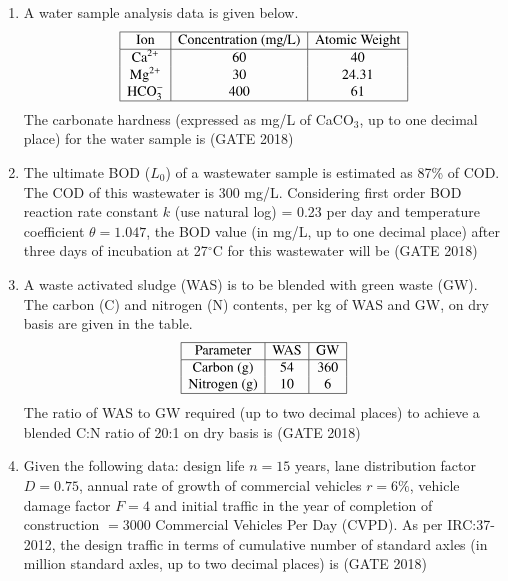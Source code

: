 \documentclass[journal,12pt,onecolumn]{IEEEtran}
\theoremstyle{remark}
\begin{document}
\begin{enumerate}
\item A water sample analysis data is given below.
\[
\begin{array}{|c|c|c|}
\hline
\text{Ion} & \text{Concentration (mg/L)} & \text{Atomic Weight} \\
\hline
\text{Ca}^{2+} & 60 & 40 \\
\text{Mg}^{2+} & 30 & 24.31 \\
\text{HCO}_3^- & 400 & 61 \\
\hline
\end{array}
\]
The carbonate hardness (expressed as mg/L of CaCO$_3$, up to one decimal place) for the water sample is \underline{\hspace{3cm}}
\hfill{(GATE 2018)}
\vspace{1cm}
\newpage
\item The ultimate BOD ($L_0$) of a wastewater sample is estimated as 87\% of COD. The COD of this wastewater is 300 mg/L. Considering first order BOD reaction rate constant $k$ (use natural log) = 0.23 per day and temperature coefficient $\theta = 1.047$, the BOD value (in mg/L, up to one decimal place) after three days of incubation at 27$^\circ$C for this wastewater will be \underline{\hspace{3cm}}
\hfill{(GATE 2018)}
\vspace{1cm}

\item A waste activated sludge (WAS) is to be blended with green waste (GW). The carbon (C) and nitrogen (N) contents, per kg of WAS and GW, on dry basis are given in the table.\\
\[
\begin{array}{|c|c|c|}
\hline
\text{Parameter} & \text{WAS} & \text{GW} \\
\hline
\text{Carbon (g)} & 54 & 360 \\
\text{Nitrogen (g)} & 10 & 6 \\
\hline
\end{array}
\]
The ratio of WAS to GW required (up to two decimal places) to achieve a blended C:N ratio of 20:1 on dry basis is \underline{\hspace{3cm}}
\hfill{(GATE 2018)}
\vspace{1cm}

\item Given the following data: design life $n = 15$ years, lane distribution factor $D = 0.75$, annual rate of growth of commercial vehicles $r = 6\%$, vehicle damage factor $F = 4$ and initial traffic in the year of completion of construction $=3000$ Commercial Vehicles Per Day (CVPD). As per IRC:37-2012, the design traffic in terms of cumulative number of standard axles (in million standard axles, up to two decimal places) is \underline{\hspace{3cm}}
\hfill{(GATE 2018)}
\vspace{1cm}


\end{enumerate}
\end{document}
